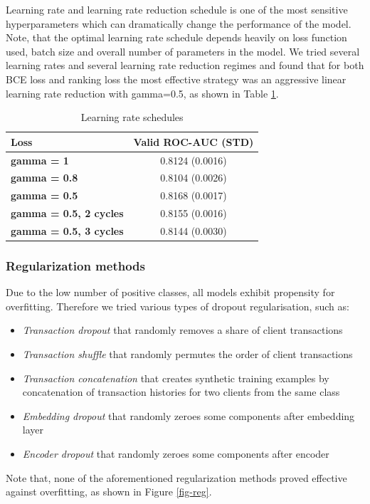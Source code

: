 \documentclass[sigconf]{acmart}
\begin{document}
Learning rate and learning rate reduction schedule is one of the most sensitive hyperparameters which can dramatically change the performance of the model.
Note, that the optimal learning rate schedule depends heavily on loss function used, batch size and overall number of parameters in the model. 
We tried several learning rates and several learning rate reduction regimes and found that for both BCE loss and ranking loss the most effective strategy was an aggressive linear learning rate reduction with gamma=0.5, as shown in Table \ref{tab-lr}.

\begin{table}[ht]
\caption{Learning rate schedules}
\begin{tabular}{ | l | c |  }
\hline
\textbf{Loss} & \textbf{Valid ROC-AUC (STD)} \\
\hline
\textbf{gamma = 1} & 0.8124 (0.0016)  \\
\textbf{gamma = 0.8} & 0.8104 (0.0026)  \\
\textbf{gamma = 0.5} & 0.8168 (0.0017)  \\
\textbf{gamma = 0.5, 2 cycles} & 0.8155 (0.0016)  \\
\textbf{gamma = 0.5, 3 cycles} & 0.8144 (0.0030)  \\
\hline
\end{tabular}
\label{tab-lr}
\end{table}

\subsubsection{Regularization methods}

Due to the low number of positive classes, all models exhibit propensity for overfitting. Therefore we tried various types of dropout regularisation, such as:
\begin{itemize}
\item \textit{Transaction dropout} that randomly removes a share of client transactions
\item \textit{Transaction shuffle} that randomly permutes the order of client transactions
\item \textit{Transaction concatenation} that creates synthetic training examples by concatenation of transaction histories for two clients from the same class
\item \textit{Embedding dropout} that randomly zeroes some components after embedding layer
\item \textit{Encoder dropout} that randomly zeroes some components after encoder
\end{itemize}
Note that, none of the aforementioned regularization methods proved effective against overfitting, as shown in Figure \ref{fig-reg}.
\end{document}

